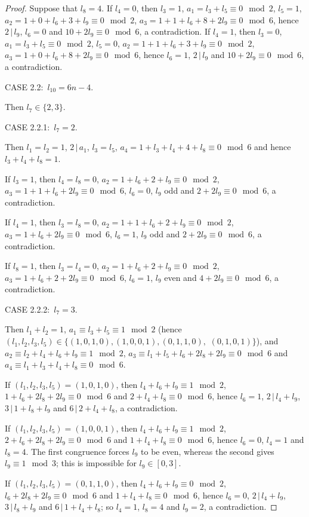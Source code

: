 \documentclass[10pt,a4paper]{amsart}
\renewcommand{\t}{\, | \,}
\begin{document}
\begin{proof}
Suppose that $l_8=4$. If $l_4=0$, then $l_3=1$, $a_1=l_3+l_5 \equiv
0 \mod 2$, $l_5=1$, $a_2=1+0+l_6+3+l_9 \equiv 0 \mod 2$,
$a_3=1+1+l_6+8+2l_9 \equiv 0 \mod 6$, hence $2 \t l_9$, $l_6=0$ and
$10+2l_9 \equiv 0 \mod 6$, a contradiction. If $l_4=1$, then
$l_3=0$, $a_1=l_3+l_5 \equiv 0 \mod 2$, $l_5=0$, $a_2=1+1+l_6+3+l_9
\equiv 0 \mod 2$, $a_3=1+0+l_6+8+2l_9 \equiv 0 \mod 6$, hence
$l_6=1$, $2 \t l_9$ and $10+2l_9 \equiv 0 \mod 6$, a contradiction.

\smallskip
\noindent CASE 2.2: \,$l_{10} = 6n-4$.

Then $l_7 \in \{2,3\}$.

\smallskip
\noindent CASE 2.2.1: \,$l_{7} = 2$.

Then $l_1=l_2=1$, $2 \t a_1$, $l_3=l_5$, $a_4 = 1+l_3+l_4+4+l_8
\equiv 0 \mod 6$ and hence $l_3+l_4+l_8=1$.

If $l_3=1$, then $l_4=l_8=0$, $a_2=1+l_6+2+l_9 \equiv 0 \mod 2$,
$a_3=1+1+l_6+2l_9 \equiv 0 \mod 6$, $l_6=0$, $l_9$ odd and $2+2l_9
\equiv 0 \mod 6$, a contradiction.

If $l_4=1$, then $l_3=l_8=0$, $a_2=1+1+l_6+2+l_9 \equiv 0 \mod 2$,
$a_3 = 1+l_6+2l_9 \equiv 0 \mod 6$, $l_6=1$, $l_9$ odd and $2+2l_9
\equiv 0 \mod 6$, a contradiction.

If $l_8=1$, then $l_3=l_4=0$, $a_2=1+l_6+2+l_9 \equiv 0 \mod 2$,
$a_3=1+l_6+2+2l_9 \equiv 0 \mod 6$, $l_6=1$, $l_9$ even and $4+2l_9
\equiv 0 \mod 6$, a contradiction.

\smallskip
\noindent CASE 2.2.2: \,$l_{7} = 3$.

Then $l_1+l_2 = 1$, $a_1 \equiv l_3+l_5 \equiv 1 \mod 2$ (hence
$(l_1,l_2,l_3,l_5) \in \{(1,0,1,0), (1,0,0,1), (0,1,1,0),$ $
(0,1,0,1)\}$), and $a_2 \equiv l_2+l_4+l_6+l_9 \equiv 1 \mod 2$,
$a_3 \equiv l_1+l_5+l_6+2l_8+2l_9 \equiv 0 \mod 6$ and $a_4 \equiv
l_1+l_3+l_4+l_8 \equiv 0 \mod 6$.

If $(l_1,l_2,l_3,l_5) = (1,0,1,0)$, then $l_4+l_6+l_9 \equiv 1 \mod
2$, $1+l_6+2l_8+2l_9 \equiv 0 \mod 6$ and $2+l_4+l_8 \equiv 0 \mod
6$, hence $l_6 = 1$, $2 \t l_4+l_9$, $3 \t 1+l_8+l_9$ and $6 \t
2+l_4+l_8$, a contradiction.

If $(l_1,l_2,l_3,l_5) = (1,0,0,1)$, then $l_4+l_6+l_9 \equiv 1 \mod
2$, $2+l_6+2l_8+2l_9 \equiv 0 \mod 6$ and $1+l_4+l_8 \equiv 0 \mod
6$, hence $l_6 = 0$, $l_4=1$ and $l_8=4$. The first congruence forces $l_9$ to be even, whereas the second gives $l_9\equiv1\mod3$; this is impossible for $l_9\in[0,3]$. 

If $(l_1,l_2,l_3,l_5) = (0,1,1,0)$, then $l_4+l_6+l_9 \equiv 0 \mod
2$, $l_6+2l_8+2l_9 \equiv 0 \mod 6$ and $1+l_4+l_8 \equiv 0 \mod 6$,
hence $l_6=0$, $2 \t l_4+l_9$, $3 \t l_8+l_9$ and $6 \t 1+l_4+l_8$;
so $l_4=1$, $l_8=4$ and $l_9=2$, a contradiction.


\end{proof}
\end{document}
